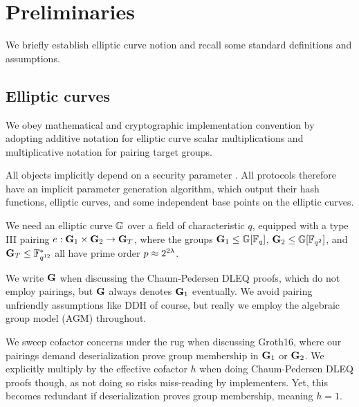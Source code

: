 
\section{Preliminaries} %
\label{sec:background}

We briefly establish elliptic curve notion and recall some standard
definitions and assumptions.



\subsection{Elliptic curves}
\label{sec:ec_background}


We obey mathematical and cryptographic implementation convention by 
adopting additive notation for elliptic curve  scalar multiplications and 
multiplicative notation for pairing target groups.

All objects implicitly depend on a security parameter \secparam.
All protocols therefore have an implicit parameter generation algorithm,
which output their hash functions, elliptic curves, and some independent base points on the elliptic curves.

We need an elliptic curve ${\mathbb{G}}$ over a field of characteristic $q$,
equipped with a type III pairing $e : {\mathbf{G}}_1 \times {\mathbf{G}}_2 \to {\mathbf{G}}_T$,
where the groups  ${\mathbf{G}}_1 \le {\mathbb{G}}[\mathbb{F}_q]$, ${\mathbf{G}}_2 \le {\mathbb{G}}[\mathbb{F}_{q^2}]$, and
${\mathbf{G}}_T \le \mathbb{F}^*_{q^{12}}$ all have prime order $p \approx 2^{2\lambda}$.

We write ${\mathbf{G}}$ when discussing the Chaum-Pedersen DLEQ proofs, which do
not employ pairings, but ${\mathbf{G}}$ always denotes ${\mathbf{G}}_1$ eventually.
We avoid pairing unfriendly assumptions like DDH of course, but really
we employ the algebraic group model (AGM) throughout.

We sweep cofactor concerns under the rug when discussing Groth16,
where our pairings demand deserialization prove group membership in ${\mathbf{G}}_1$
or ${\mathbf{G}}_2$.  We explicitly multiply by the effective cofactor $h$ when
doing Chaum-Pedersen DLEQ proofs though, as not doing so risks miss-reading
by implementers.  Yet, this becomes redundant if deserialization proves
group membership, meaning $h=1$.

